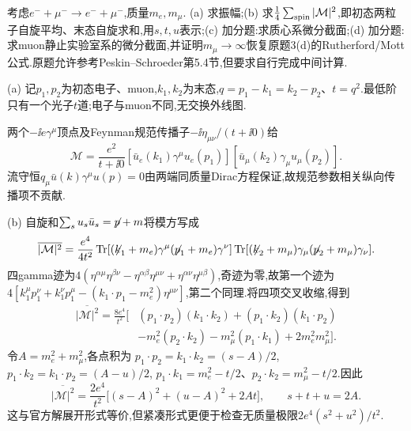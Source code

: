 \begin{exercise}
考虑$e^-+\mu^-\to e^-+\mu^-$,质量$m_e,m_\mu$.
(a) 求振幅;(b) 求$\frac14\sum_{\rm spin}|\mathcal M|^2$,即初态两粒子自旋平均、末态自旋求和,用$s,t,u$表示;(c) 加分题:求质心系微分截面;(d) 加分题:求muon静止实验室系的微分截面,并证明$m_\mu\to\infty$恢复原题3(d)的Rutherford/Mott公式.原题允许参考Peskin--Schroeder第5.4节,但要求自行完成中间计算.
\end{exercise}
\begin{solution}
(a) 记$p_1,p_2$为初态电子、muon,$k_1,k_2$为末态,$q=p_1-k_1=k_2-p_2$、$t=q^2$.最低阶只有一个光子$t$道;电子与muon不同,无交换外线图.
\begin{center}\end{center}
两个$-\ii e\gamma^\mu$顶点及Feynman规范传播子$-\ii\eta_{\mu\nu}/(t+\ii0)$给
\[
 \mathcal M=\frac{e^2}{t+\ii0}
 [\bar u_e(k_1)\gamma^\mu u_e(p_1)]
 [\bar u_\mu(k_2)\gamma_\mu u_\mu(p_2)].
\]
流守恒$q_\mu\bar u(k)\gamma^\mu u(p)=0$由两端同质量Dirac方程保证,故规范参数相关纵向传播项不贡献.

(b) 自旋和$\sum_su_s\bar u_s=\slashed p+m$将模方写成
\[
 \overline{|\mathcal M|^2}=\frac{e^4}{4t^2}
 \Tr[(\slashed k_1+m_e)\gamma^\mu(\slashed p_1+m_e)\gamma^\nu]
 \Tr[(\slashed k_2+m_\mu)\gamma_\mu(\slashed p_2+m_\mu)\gamma_\nu].
\]
四gamma迹为$4(\eta^{\alpha\mu}\eta^{\beta\nu}-\eta^{\alpha\beta}\eta^{\mu\nu}+\eta^{\alpha\nu}\eta^{\mu\beta})$,奇迹为零,故第一个迹为
$4[k_1^\mu p_1^\nu+k_1^\nu p_1^\mu-(k_1\cdot p_1-m_e^2)\eta^{\mu\nu}]$,第二个同理.将四项交叉收缩,得到
\begin{align*}
 \overline{|\mathcal M|^2}=\frac{8e^4}{t^2}\big[&
 (p_1\cdot p_2)(k_1\cdot k_2)+(p_1\cdot k_2)(k_1\cdot p_2)\\
 &-m_e^2(p_2\cdot k_2)-m_\mu^2(p_1\cdot k_1)+2m_e^2m_\mu^2\big].
\end{align*}
令$A=m_e^2+m_\mu^2$,各点积为
$p_1\cdot p_2=k_1\cdot k_2=(s-A)/2$,
$p_1\cdot k_2=k_1\cdot p_2=(A-u)/2$,
$p_1\cdot k_1=m_e^2-t/2$、$p_2\cdot k_2=m_\mu^2-t/2$.因此
\[
 \boxed{\overline{|\mathcal M|^2}=
 \frac{2e^4}{t^2}\big[(s-A)^2+(u-A)^2+2At\big]},\qquad s+t+u=2A.
\]
这与官方解展开形式等价,但紧凑形式更便于检查无质量极限$2e^4(s^2+u^2)/t^2$.


\end{solution}
